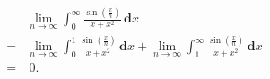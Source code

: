 \documentclass{beamer}
\newcommand{\der}{\,\mathbf{d}}
\begin{document}
    \begin{frame}
        \[
            \begin{aligned}
                &\lim_{n\to \infty}\int_0^\infty\frac{\sin\left(\frac{x}{n}\right)}{x+x^2}\der x
                \\
                =&\lim_{n\to \infty}\int_0^1\frac{\sin\left(\frac{x}{n}\right)}{x+x^2}\der x+\lim_{n\to \infty}\int_1^\infty\frac{\sin\left(\frac{x}{n}\right)}{x+x^2}\der x\\
                =&\ 0. 
            \end{aligned}
        \]      
    \end{frame}
\end{document}
